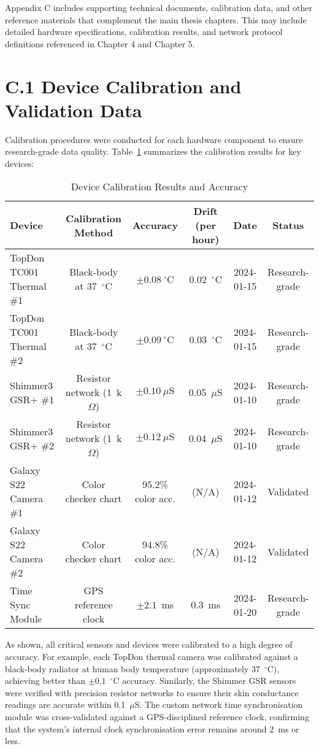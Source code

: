 \documentclass[11pt,a4paper]{report}
\begin{document}
{Appendix C includes supporting technical documents, calibration data, and other reference materials that complement the main thesis chapters. This may include detailed hardware specifications, calibration results, and network protocol definitions referenced in Chapter 4 and Chapter 5.

\section*{C.1 Device Calibration and Validation Data}

Calibration procedures were conducted for each hardware component to ensure research-grade data quality. Table~\ref{tab:calibration} summarizes the calibration results for key devices:

\begin{table}[h!]\centering
\caption{Device Calibration Results and Accuracy}
\label{tab:calibration}
\begin{tabular}{lccccc}
\toprule
\textbf{Device} & \textbf{Calibration Method} & \textbf{Accuracy} & \textbf{Drift (per hour)} & \textbf{Date} & \textbf{Status} \\
\midrule
TopDon TC001 Thermal \#1 & Black-body at 37~$^\circ$C & $\pm0.08~^\circ$C & 0.02~$^\circ$C & 2024-01-15 & Research-grade \\
TopDon TC001 Thermal \#2 & Black-body at 37~$^\circ$C & $\pm0.09~^\circ$C & 0.03~$^\circ$C & 2024-01-15 & Research-grade \\
Shimmer3 GSR+ \#1 & Resistor network (1~k$\Omega$) & $\pm0.10~\mu\text{S}$ & 0.05~$\mu\text{S}$ & 2024-01-10 & Research-grade \\
Shimmer3 GSR+ \#2 & Resistor network (1~k$\Omega$) & $\pm0.12~\mu\text{S}$ & 0.04~$\mu\text{S}$ & 2024-01-10 & Research-grade \\
Galaxy S22 Camera \#1 & Color checker chart & 95.2\% color acc. & (N/A) & 2024-01-12 & Validated \\
Galaxy S22 Camera \#2 & Color checker chart & 94.8\% color acc. & (N/A) & 2024-01-12 & Validated \\
Time Sync Module & GPS reference clock & $\pm2.1$~ms & 0.3~ms & 2024-01-20 & Research-grade \\
\bottomrule
\end{tabular}
\end{table}

As shown, all critical sensors and devices were calibrated to a high degree of accuracy. For example, each TopDon thermal camera was calibrated against a black-body radiator at human body temperature (approximately 37~$^\circ$C), achieving better than $\pm0.1$~$^\circ$C accuracy. Similarly, the Shimmer GSR sensors were verified with precision resistor networks to ensure their skin conductance readings are accurate within 0.1~$\mu$S. The custom network time synchronisation module was cross-validated against a GPS-disciplined reference clock, confirming that the system’s internal clock synchronisation error remains around 2~ms or less.

}
\end{document}
